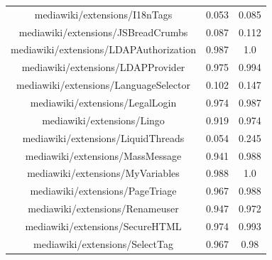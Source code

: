 \begin{table}[H]
\begin{tabular}{@{}c c c@{}}
mediawiki/extensions/I18nTags & 0.053 & 0.085 \\
mediawiki/extensions/JSBreadCrumbs & 0.087 & 0.112 \\
mediawiki/extensions/LDAPAuthorization & 0.987 & 1.0 \\
mediawiki/extensions/LDAPProvider & 0.975 & 0.994 \\
mediawiki/extensions/LanguageSelector & 0.102 & 0.147 \\
mediawiki/extensions/LegalLogin & 0.974 & 0.987 \\
mediawiki/extensions/Lingo & 0.919 & 0.974 \\
mediawiki/extensions/LiquidThreads & 0.054 & 0.245 \\
mediawiki/extensions/MassMessage & 0.941 & 0.988 \\
mediawiki/extensions/MyVariables & 0.988 & 1.0 \\
mediawiki/extensions/PageTriage & 0.967 & 0.988 \\
mediawiki/extensions/Renameuser & 0.947 & 0.972 \\
mediawiki/extensions/SecureHTML & 0.974 & 0.993 \\
mediawiki/extensions/SelectTag & 0.967 & 0.98 \\
    \hline
\end{tabular}
    \label{table:accuracy-score-merged-voted-appendix-c-part-3}
\end{table}


